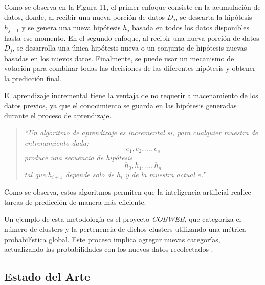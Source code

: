             Como se observa en la Figura 11, el primer enfoque consiste en la acumulación de datos, donde, al recibir una nueva porción de datos \(D_j\), se descarta la hipótesis \(h_{j-1}\) y se genera una nueva hipótesis \(h_j\) basada en todos los datos disponibles hasta ese momento. En el segundo enfoque, al recibir una nueva porción de datos \(D_j\), se desarrolla una única hipótesis nueva o un conjunto de hipótesis nuevas basadas en los nuevos datos. Finalmente, se puede usar un mecanismo de votación para combinar todas las decisiones de las diferentes hipótesis y obtener la predicción final.

            El aprendizaje incremental tiene la ventaja de no requerir almacenamiento de los datos previos, ya que el conocimiento se guarda en las hipótesis generadas durante el proceso de aprendizaje.

            \begin{quote}
                \textit{``Un algoritmo de aprendizaje es incremental si, para cualquier muestra de entrenamiento dada:
                \begin{equation*}
                    e_1, e_2, ..., e_s
                \end{equation*}
                produce una secuencia de hipótesis
                \begin{equation*}
                    h_0, h_1, ..., h_n
                \end{equation*}
                tal que \(h_{i+1}\) depende solo de \(h_i\) y de la muestra actual \(e\)\cite{GiraudCarrier2000}.''}
            \end{quote}

            Como se observa, estos algoritmos permiten que la inteligencia artificial realice tareas de predicción de manera más eficiente.

            Un ejemplo de esta metodología es el proyecto \textit{COBWEB}, que categoriza el número de clusters y la pertenencia de dichos clusters utilizando una métrica probabilística global. Este proceso implica agregar nuevas categorías, actualizando las probabilidades con los nuevos datos recolectados \cite{fisher1987}.
    
    \subsection{Estado del Arte}
